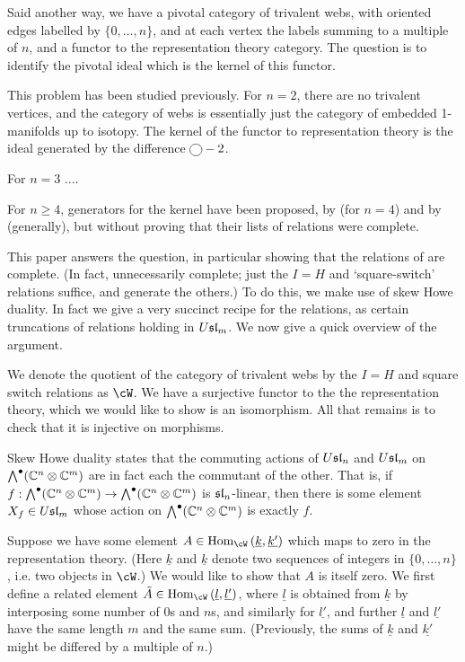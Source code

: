 \documentclass[11pt,leqno]{article}
\begin{document}
Said another way, we have a pivotal category of trivalent webs, with oriented edges labelled by $\{0, \ldots, n\}$, and at each vertex the labels summing to a multiple of $n$, and a functor to the representation theory category. The question is to identify the pivotal ideal which is the kernel of this functor.

This problem has been studied previously. For $n=2$, there are no trivalent vertices, and the category of webs is essentially just the category of embedded 1-manifolds up to isotopy. The kernel of the functor to representation theory is the ideal generated by the difference $\tikz[baseline=-2pt]{\node[draw,circle] {};} - 2$. 

For $n=3$ .... 

For $n \geq 4$, generators for the kernel have been proposed, by \cite{} (for $n=4$) and by \cite{} (generally), but without proving that their lists of relations were complete.

This paper answers the question, in particular showing that the relations of \cite{} are complete. (In fact, unnecessarily complete; just the $I=H$ and `square-switch' relations suffice, and generate the others.) To do this, we make use of skew Howe duality. In fact we give a very succinct recipe for the relations, as certain truncations of relations holding in $\Usl{m}$. We now give a quick overview of the argument.

We denote the quotient of the category of trivalent webs by the $I=H$ and square switch relations as $\cW$. We have a surjective functor to the the representation theory, which we would like to show is an isomorphism. All that remains is to check that it is injective on morphisms.

Skew Howe duality states that the commuting actions of $\Usl{n}$ and $\Usl{m}$ on $\Alt^\bullet(\mathbb{C}^n \tensor \mathbb{C}^m)$ are in fact each the commutant of the other. That is, if  $f: \Alt^\bullet(\mathbb{C}^n \tensor \mathbb{C}^m) \to \Alt^\bullet(\mathbb{C}^n \tensor \mathbb{C}^m)$ is $\sl{n}$-linear, then there is some element $X_f \in \Usl{m}$ whose action on  $\Alt^\bullet(\mathbb{C}^n \tensor \mathbb{C}^m)$ is exactly $f$.

Suppose we have some element $A \in \Hom{\cW}{\underline{k}}{\underline{k'}}$ which maps to zero in the representation theory. (Here $\underline{k}$ and $\underline{k}$ denote two sequences of integers in $\{0,\ldots,n\}$, i.e. two objects in $\cW$.) We would like to show that $A$ is itself zero. We first define a related element $\tilde{A} \in \Hom{\cW}{\underline{l}}{\underline{l'}}$, where $\underline{l}$ is obtained from $\underline{k}$ by interposing some number of $0$s and $n$s, and similarly for $\underline{l'}$, and further $\underline{l}$ and $\underline{l'}$ have the same length $m$ and the same sum. (Previously, the sums of $\underline{k}$ and $\underline{k'}$ might be differed by a multiple of $n$.)
\end{document}
